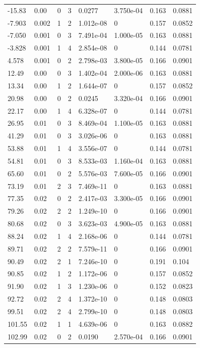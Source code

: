 \documentclass[preview]{standalone}
\begin{document}
{{\begin{tabular}{L{1.2cm}C{1.2cm} C{0.3cm}C{0.5cm} C{1.4cm}C{1.4cm} C{1.4cm}C{1.4cm}}
  -15.83  &  0.00  & 0     &  3 &  0.0277  & 3.750e-04  & 0.163 &  0.0881   \\ 
  -7.903  &  0.002  & 1     &  2 &  1.012e-08  & 0  & 0.157 &  0.0852   \\ 
  -7.050  &  0.001  & 0     &  3 &  7.491e-04  & 1.000e-05  & 0.163 &  0.0881   \\ 
  -3.828  &  0.001  & 1     &  4 &  2.854e-08  & 0  & 0.144 &  0.0781   \\ 
  4.578  &  0.001  & 0     &  2 &  2.798e-03  & 3.800e-05  & 0.166 &  0.0901   \\ 
  12.49  &  0.00  & 0     &  3 &  1.402e-04  & 2.000e-06  & 0.163 &  0.0881   \\ 
  13.34  &  0.00  & 1     &  2 &  1.644e-07  & 0  & 0.157 &  0.0852   \\ 
  20.98  &  0.00  & 0     &  2 &  0.0245  & 3.320e-04  & 0.166 &  0.0901   \\ 
  22.17  &  0.00  & 1     &  4 &  6.328e-07  & 0  & 0.144 &  0.0781   \\ 
  26.95  &  0.01  & 0     &  3 &  8.469e-04  & 1.100e-05  & 0.163 &  0.0881   \\ 
  41.29  &  0.01  & 0     &  3 &  3.026e-06  & 0  & 0.163 &  0.0881   \\ 
  53.88  &  0.01  & 1     &  4 &  3.556e-07  & 0  & 0.144 &  0.0781   \\ 
  54.81  &  0.01  & 0     &  3 &  8.533e-03  & 1.160e-04  & 0.163 &  0.0881   \\ 
  65.60  &  0.01  & 0     &  2 &  5.576e-03  & 7.600e-05  & 0.166 &  0.0901   \\ 
  73.19  &  0.01  & 2     &  3 &  7.469e-11  & 0  & 0.163 &  0.0881   \\ 
  77.35  &  0.02  & 0     &  2 &  2.417e-03  & 3.300e-05  & 0.166 &  0.0901   \\ 
  79.26  &  0.02  & 2     &  2 &  1.249e-10  & 0  & 0.166 &  0.0901   \\ 
  80.68  &  0.02  & 0     &  3 &  3.623e-03  & 4.900e-05  & 0.163 &  0.0881   \\ 
  88.24  &  0.02  & 1     &  4 &  2.168e-06  & 0  & 0.144 &  0.0781   \\ 
  89.71  &  0.02  & 2     &  2 &  7.579e-11  & 0  & 0.166 &  0.0901   \\ 
  90.49  &  0.02  & 2     &  1 &  7.246e-10  & 0  & 0.191 &  0.104   \\ 
  90.85  &  0.02  & 1     &  2 &  1.172e-06  & 0  & 0.157 &  0.0852   \\ 
  91.90  &  0.02  & 1     &  3 &  1.230e-06  & 0  & 0.152 &  0.0823   \\ 
  92.72  &  0.02  & 2     &  4 &  1.372e-10  & 0  & 0.148 &  0.0803   \\ 
  99.51  &  0.02  & 2     &  4 &  2.799e-10  & 0  & 0.148 &  0.0803   \\ 
  101.55  &  0.02  & 1     &  1 &  4.639e-06  & 0  & 0.163 &  0.0882   \\ 
  102.99  &  0.02  & 0     &  2 &  0.0190  & 2.570e-04  & 0.166 &  0.0901   \\ 
\hline 
\end{tabular} 

}}
\end{document}
